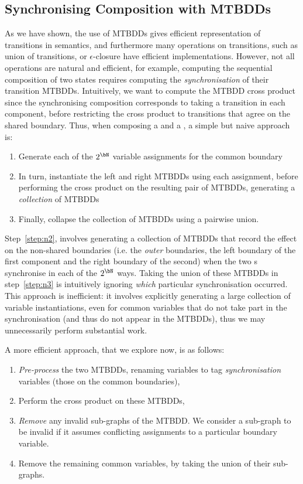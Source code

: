 \subsection{Synchronising Composition with MTBDDs}

As we have shown, the use of MTBDDs gives efficient representation of
transitions in \TNFA{} semantics, and furthermore many operations on
transitions, such as union of transitions, or $\epsilon$-closure have efficient
implementations. However, not all operations are natural and efficient, for
example, computing the sequential composition of two states requires computing
the \emph{synchronisation} of their transition MTBDDs. Intuitively, we want to
compute the MTBDD cross product since the synchronising composition corresponds
to taking a transition in each component, before restricting the cross product
to transitions that agree on the shared boundary. Thus, when composing a
\NFAB{\aN}{\bN} and a \NFAB{\bN}{\cN}, a simple but naive approach is:
\begin{enumerate}
    \item \label{step:n1} Generate each of the $2^\bN$ variable assignments for
        the common boundary
    \item \label{step:n2} In turn, instantiate the left and right MTBDDs using
        each assignment, before performing the cross product on the resulting
        pair of MTBDDs, generating a \emph{collection} of MTBDDs
    \item \label{step:n3} Finally, collapse the collection of MTBDDs using a
        pairwise union.
\end{enumerate}
Step~\ref{step:n2}, involves generating a collection of MTBDDs that record the
effect on the non-shared boundaries (i.e. the \emph{outer} boundaries, the left
boundary of the first component and the right boundary of the second) when the
two \TNFA{}s synchronise in each of the $2^\bN$ ways. Taking the union of these
MTBDDs in step~\ref{step:n3} is intuitively ignoring \emph{which} particular
synchronisation occurred. This approach is inefficient: it involves explicitly
generating a large collection of variable instantiations, even for common
variables that do not take part in the synchronisation (and thus do not appear
in the MTBDDs), thus we may unnecessarily perform substantial work.

A more efficient approach, that we explore now, is as follows:
\begin{enumerate}
    \item \label{step:b1} \emph{Pre-process} the two MTBDDs, renaming variables
        to tag \emph{synchronisation} variables (those on the common
        boundaries),
    \item \label{step:b2} Perform the cross product on these MTBDDs,
    \item \label{step:b3} \emph{Remove} any invalid sub-graphs of the MTBDD. We
        consider a sub-graph to be invalid if it assumes conflicting
        assignments to a particular boundary variable.
    \item \label{step:b4} Remove the remaining common variables, by taking the
        union of their sub-graphs.
\end{enumerate}

